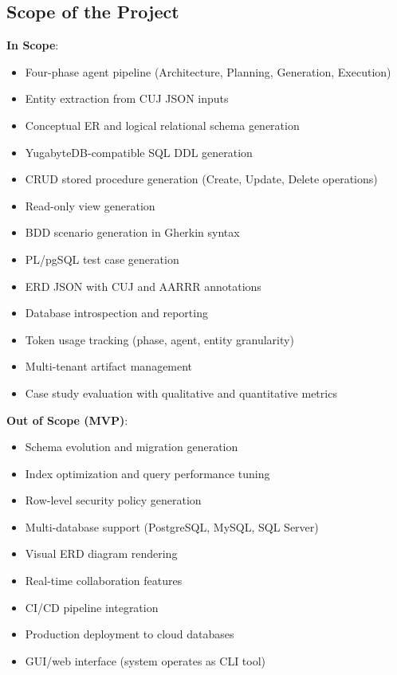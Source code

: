 \documentclass[12pt,a4paper]{article}
\begin{document}
\subsection{Scope of the Project}

\textbf{In Scope}:

\begin{itemize}
\item Four-phase agent pipeline (Architecture, Planning, Generation, Execution)
\item Entity extraction from CUJ JSON inputs
\item Conceptual ER and logical relational schema generation
\item YugabyteDB-compatible SQL DDL generation
\item CRUD stored procedure generation (Create, Update, Delete operations)
\item Read-only view generation
\item BDD scenario generation in Gherkin syntax
\item PL/pgSQL test case generation
\item ERD JSON with CUJ and AARRR annotations
\item Database introspection and reporting
\item Token usage tracking (phase, agent, entity granularity)
\item Multi-tenant artifact management
\item Case study evaluation with qualitative and quantitative metrics
\end{itemize}

\textbf{Out of Scope (MVP)}:

\begin{itemize}
\item Schema evolution and migration generation
\item Index optimization and query performance tuning
\item Row-level security policy generation
\item Multi-database support (PostgreSQL, MySQL, SQL Server)
\item Visual ERD diagram rendering
\item Real-time collaboration features
\item CI/CD pipeline integration
\item Production deployment to cloud databases
\item GUI/web interface (system operates as CLI tool)
\end{itemize}
\end{document}

